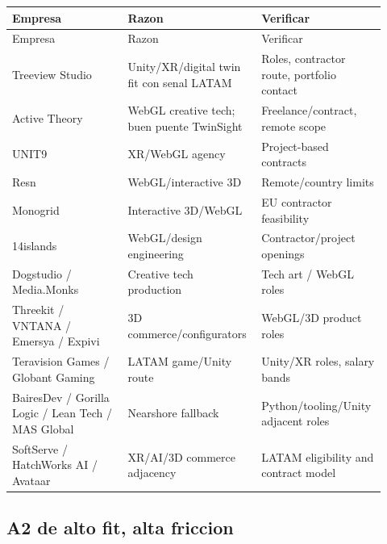 \begin{center}
\scriptsize
\begin{longtable}{>{\raggedright\arraybackslash}p{0.305\linewidth} >{\raggedright\arraybackslash}p{0.305\linewidth} >{\raggedright\arraybackslash}p{0.305\linewidth}}
\toprule
Empresa & Razon & Verificar \\
\midrule
\endfirsthead
\toprule
Empresa & Razon & Verificar \\
\midrule
\endhead
Treeview Studio & Unity/XR/digital twin fit con senal LATAM & Roles, contractor route, portfolio contact \\
Active Theory & WebGL creative tech; buen puente TwinSight & Freelance/contract, remote scope \\
UNIT9 & XR/WebGL agency & Project-based contracts \\
Resn & WebGL/interactive 3D & Remote/country limits \\
Monogrid & Interactive 3D/WebGL & EU contractor feasibility \\
14islands & WebGL/design engineering & Contractor/project openings \\
Dogstudio / Media.Monks & Creative tech production & Tech art / WebGL roles \\
Threekit / VNTANA / Emersya / Expivi & 3D commerce/configurators & WebGL/3D product roles \\
Teravision Games / Globant Gaming & LATAM game/Unity route & Unity/XR roles, salary bands \\
BairesDev / Gorilla Logic / Lean Tech / MAS Global & Nearshore fallback & Python/tooling/Unity adjacent roles \\
SoftServe / HatchWorks AI / Avataar & XR/AI/3D commerce adjacency & LATAM eligibility and contract model \\
\bottomrule
\end{longtable}
\end{center}


\subsection{A2 de alto fit, alta friccion}


